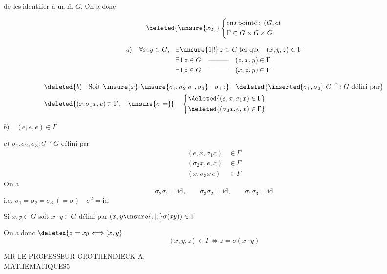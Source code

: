   de les identifier à un $\overline{\mathrm m}$ $G$. On a donc

\[
\deleted{\unsure{x_2}}\left\{\begin{aligned}
&\text{ens pointé : }(G,e)\\
&\Gamma\subset G\times G\times G
\end{aligned}\right.
\]

\[
\begin{aligned}
a)\quad\forall x,y\in G,\quad &\exists\unsure{1|!}\,z\in G\ \text{tel que}\quad (x,y,z)\in\Gamma\\
&\exists1\,z\in G\quad\text{---------}\quad(z,x,y)\in\Gamma\\
&\exists1\,z\in G\quad\text{---------}\quad(x,z,y)\in\Gamma
\end{aligned}
\]

\[
\begin{aligned}
&\deleted{b)\quad\text{Soit }\unsure{x}\ \unsure{\sigma_1,\sigma_2|\sigma_1,\sigma_3}\quad\sigma_1:}
 \quad\deleted{\inserted{\sigma_1,\sigma_2}\ G\xrightarrow{\sim}G\ \text{défini par}}\\
&\deleted{(x,\sigma_1 x,e)\in\Gamma,\quad\unsure{\sigma=}}
\quad\left\{\begin{aligned}
&\deleted{(e,x,\sigma_1 x)\in\Gamma}\\
&\deleted{(\sigma_2 x,e,x)\in\Gamma}
\end{aligned}\right.
\end{aligned}
\]

$b)\quad(e,e,e)\in\Gamma$

$c)$  $\sigma_1,\sigma_2,\sigma_3:G\overset{\sim}{\text{---}}G$ défini par
\[
\begin{aligned}
(e,x,\sigma_1x)&\in\Gamma\\
(\sigma_2x,e,x)&\in\Gamma\\
(x,\sigma_3x\, e)&\in\Gamma
\end{aligned}
\]
On a 
\[
\sigma_2\sigma_1=\mathrm{id},\qquad\sigma_3\sigma_2=\mathrm{id},\qquad\sigma_1\sigma_3=\mathrm{id}
\]
i.e. $\sigma_1=\sigma_2=\sigma_3\ (=\sigma)\quad\sigma^2=\mathrm{id}$.

Si $x,y\in G$ soit $x\cdot y\in G$ défini par $(x,y\unsure{,|;}\sigma(xy))\in\Gamma$

On a donc $\deleted{z=xy\Longleftrightarrow (x,y}$
\[
(x,y,z)\in\Gamma\Longleftrightarrow z=\sigma(x\cdot y)
\]

MR LE PROFESSEUR GROTHENDIECK A.\\
MATHEMATIQUES\hfill 5

